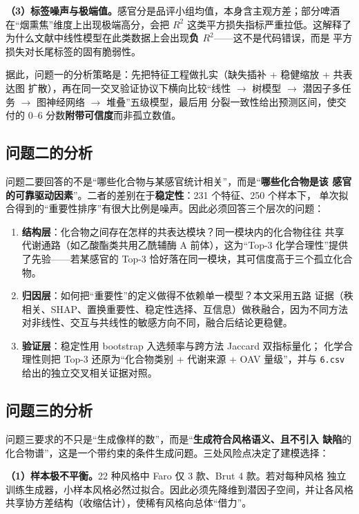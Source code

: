 \textbf{（3）标签噪声与极端值。}感官分是品评小组均值，本身含主观方差；部分啤酒
在“烟熏焦”维度上出现极端高分，会把 $R^2$ 这类平方损失指标严重拉低。这解释了
为什么文献中线性模型在此类数据上会出现\textbf{负 $R^2$}——这不是代码错误，而是
平方损失对长尾标签的固有脆弱性。

据此，问题一的分析策略是：先把特征工程做扎实（缺失插补 + 稳健缩放 + 共表达图
扩散），再在同一交叉验证协议下横向比较“线性 $\rightarrow$ 树模型 $\rightarrow$
潜因子多任务 $\rightarrow$ 图神经网络 $\rightarrow$ 堆叠”五级模型，最后用
分裂一致性给出预测区间，使交付的 0--6 分数\textbf{附带可信度}而非孤立数值。

\subsection{问题二的分析}

问题二要回答的不是“哪些化合物与某感官统计相关”，而是“\textbf{哪些化合物是该
感官的可靠驱动因素}”。二者的差别在于\textbf{稳定性}：231 个特征、250 个样本下，
单次拟合得到的“重要性排序”有很大比例是噪声。因此必须回答三个层次的问题：

\begin{enumerate}[label=(\arabic*),leftmargin=2.2em,itemsep=1pt]
\item \textbf{结构层}：化合物之间存在怎样的共表达模块？同一模块内的化合物往往
  共享代谢通路（如乙酸酯类共用乙酰辅酶 A 前体），这为“Top-3 化学合理性”提供
  了先验——若某感官的 Top-3 恰好落在同一模块，其可信度高于三个孤立化合物。
\item \textbf{归因层}：如何把“重要性”的定义做得不依赖单一模型？本文采用五路
  证据（秩相关、SHAP、置换重要性、稳定性选择、互信息）做秩融合，因为不同方法
  对非线性、交互与共线性的敏感方向不同，融合后结论更稳健。
\item \textbf{验证层}：稳定性用 bootstrap 入选频率与跨方法 Jaccard 双指标量化；
  化学合理性则把 Top-3 还原为“化合物类别 + 代谢来源 + OAV 量级”，并与
  \texttt{6.csv} 给出的独立交叉相关证据对照。
\end{enumerate}

\subsection{问题三的分析}

问题三要求的不只是“生成像样的数”，而是“\textbf{生成符合风格语义、且不引入
缺陷}的化合物谱”，这是一个带约束的条件生成问题。三处风险点决定了建模选择：

\textbf{（1）样本极不平衡。}22 种风格中 Faro 仅 3 款、Brut 4 款。若对每种风格
独立训练生成器，小样本风格必然过拟合。因此必须先降维到潜因子空间，并让各风格
共享协方差结构（收缩估计），使稀有风格向总体“借力”。

